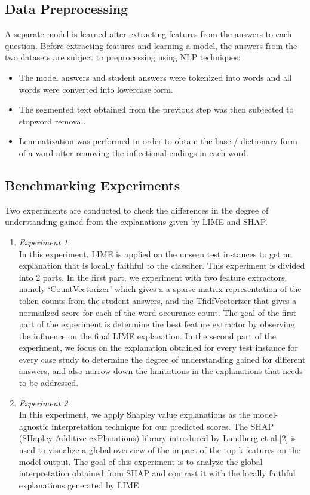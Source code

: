 \documentclass[letterpaper, 10 pt, conference]{ieeeconf}  %
\begin{document}
\subsection{Data Preprocessing}
A separate model is learned after extracting features from the answers to each question. Before extracting features and learning a model, the answers from the two datasets are subject to preprocessing using NLP techniques:
\begin{itemize}
\item The model answers and student answers were tokenized into words and all words were converted into lowercase form.
\item The segmented text obtained from the previous step was then subjected to stopword removal.
\item Lemmatization was performed in order to obtain the base / dictionary form of a word after removing the inflectional endings in each word.
\end{itemize}

\subsection{Benchmarking Experiments}
Two experiments are conducted to check the differences in the degree of understanding gained from the explanations given by LIME and SHAP.
\begin{enumerate}
\item \textit{Experiment 1}:\\
In this experiment, LIME is applied on the unseen test instances  to get an explanation that is locally faithful to the classifier. This experiment is divided into 2 parts. In the first part, we experiment with two feature extractors, namely `CountVectorizer' which gives a a sparse matrix representation of the token counts from the student answers, and the TfidfVectorizer that gives a normailzed score for each of the word occurance count. The goal of the first part of the experiment is determine the best feature extractor by observing the influence  on the final LIME explanation. In the second part of the experiment, we focus on the explanation obtained for every test instance for every case study to determine the degree of understanding gained for different answers, and also narrow down the limitations in the explanations that needs to be addressed.
\item \textit{Experiment 2}:\\
In this experiment, we apply Shapley value explanations as the model-agnostic interpretation technique for our predicted scores. The SHAP (SHapley Additive exPlanations) library
introduced by Lundberg et al.[2] is used to visualize a global overview of the impact of the top k features on the model output. The goal of this experiment is to analyze the global interpretation obtained from SHAP and contrast it with the locally faithful explanations generated by LIME.
\end{enumerate}
\end{document}
